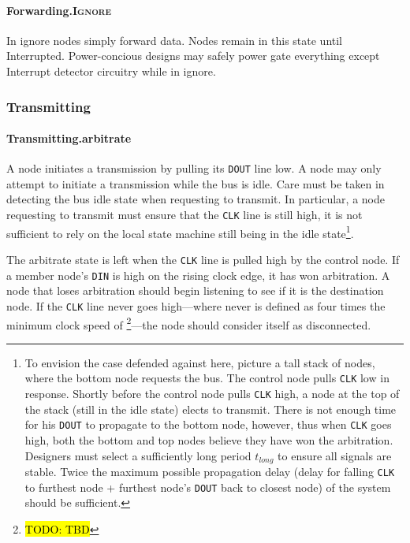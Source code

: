 \paragraph{Forwarding.\textsc{Ignore}}
In {\sc ignore} nodes simply forward data. Nodes remain in this state until
Interrupted. Power-concious designs may safely power gate everything
except Interrupt detector circuitry while in {\sc ignore}.

\subsubsection{Transmitting}

\paragraph{Transmitting.{\sc arbitrate}}
\label{sec:state-arbitrate}
A node initiates a transmission by pulling its {\tt DOUT} line low. A node may
only attempt to initiate a transmission while the bus is idle. Care must be
taken in detecting the bus idle state when requesting to transmit. In
particular, a node requesting to transmit must ensure that the {\tt CLK} line
is still high, it is not sufficient to rely on the local state machine still
being in the {\sc idle} state\footnote{To envision the case defended against
here, picture a tall stack of nodes, where the bottom node requests the bus.
The control node pulls {\tt CLK} low in response. Shortly before the control
node pulls {\tt CLK} high, a node at the top of the stack (still in the {\sc
idle} state) elects to transmit. There is not enough time for his {\tt DOUT}
to propagate to the bottom node, however, thus when {\tt CLK} goes high, both
the bottom and top nodes believe they have won the arbitration. Designers must
select a sufficiently long period $t_{long}$ to ensure all signals are stable.
Twice the maximum possible propagation delay (delay for falling {\tt CLK} to
furthest node + furthest node's {\tt DOUT} back to closest node) of the system
should be sufficient.}.

The {\sc arbitrate} state is left when the {\tt CLK} line is pulled high by
the control node. If a member node's {\tt DIN} is high on the rising clock
edge, it has won arbitration. A node that loses arbitration should begin
listening to see if it is the destination node. If the {\tt CLK} line never
goes high---where never is defined as four times the minimum clock speed of
\bus\footnote{\hl{TODO: TBD}}---the node should consider itself as
disconnected.

